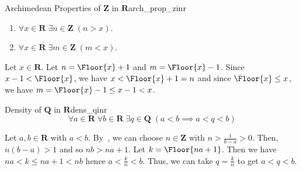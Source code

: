 \begin{Theorem}{Archimedean Properties of $ \mathbf{Z} $ in $ \mathbf{R} $}{arch_prop_zinr}
    \begin{enumerate}[label=(\arabic*)]
        \item\label{arch_prop_zinr_1} $ \forall x\in\mathbf{R}\;\exists n\in\mathbf{Z}\;(n>x) $.
        \item\label{arch_prop_zinr_2} $ \forall x\in\mathbf{R}\;\exists m\in\mathbf{Z}\;(m<x) $.
    \end{enumerate}
\end{Theorem}
\begin{Proof}{}{}
    Let $ x\in\mathbf{R} $. Let $ n=\Floor{x}+1 $ and $ m=\Floor{x}-1 $.
    Since $ x-1<\Floor{x} $, we have $ x<\Floor{x}+1=n $ and since
    $ \Floor{x}\le x $, we have $ m=\Floor{x}-1\le x-1<x $.
\end{Proof}
\begin{Theorem}{Density of $ \mathbf{Q} $ in $ \mathbf{R} $}{dens_qinr}
    \[ \forall a\in\mathbf{R}\;\forall b\in\mathbf{R}\;\exists q\in\mathbf{Q}\;
        (a<b\implies a<q<b) \]
\end{Theorem}
\begin{Proof}{}{}
    Let $ a,b\in\mathbf{R} $ with $ a<b $. By~,
    we can choose $ n\in\mathbf{Z} $ with $ n>\frac{1}{b-a} >0 $. Then,
    $ n(b-a)>1 $ and so $ nb>na+1 $. Let $ k=\Floor{na+1} $.
    Then we have $ na<k\le na+1<nb $ hence $ a<\frac{k}{n} <b $. Thus,
    we can take $ q=\frac{k}{n} $ to get $ a<q<b $.
\end{Proof}


